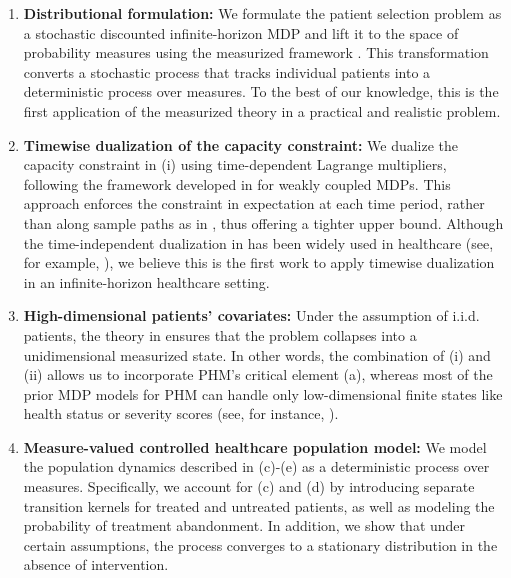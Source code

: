 \documentclass[12pt,a4paper]{article}
\newcommand{\bx}{\mathbf{x}}
\begin{document}
	
	\begin{enumerate}
		\item[(i)] {\bf Distributional formulation:} We formulate the patient selection problem as a stochastic discounted infinite-horizon MDP and lift it to the space of probability measures using the measurized framework \citep{measurized}. This transformation converts a stochastic process that tracks individual patients into a deterministic process over measures. To the best of our knowledge, this is the first application of the measurized theory in a practical and realistic problem.
		\item[(ii)]  {\bf Timewise dualization of the capacity constraint:} We dualize the capacity constraint in (i) using time-dependent Lagrange multipliers, following the framework developed in \cite{measurizedWMDP} for weakly coupled MDPs. This approach enforces the constraint in expectation at each time period, rather than along sample paths as in \cite{adelman_weakly}, thus offering a tighter upper bound. Although the time-independent dualization in \cite{adelman_weakly} has been widely used in healthcare (see, for example, \cite{grandclement}), we believe this is the first work to apply timewise dualization in an infinite-horizon healthcare setting. 
		\item[(iii)] {\bf High-dimensional patients' covariates:} Under the assumption of i.i.d. patients, the theory in \cite{measurizedWMDP} ensures that the problem collapses into a unidimensional measurized state. 
        In other words, the combination of (i) and (ii) allows us to incorporate PHM's critical element (a), whereas most of the prior MDP models for PHM can handle only low-dimensional finite states like health status or severity scores (see, for instance, \cite{zhang2017,grandclement}).
		\item[(iv)] {\bf Measure-valued controlled healthcare population model:} We model the population dynamics described in (c)-(e) as a deterministic process over measures. Specifically, we account for (c) and (d) by introducing separate transition kernels for treated and untreated patients, as well as modeling the probability of treatment abandonment. In addition, we show that under certain assumptions, the process converges to a stationary distribution in the absence of intervention. 

\end{enumerate}
\end{document}

